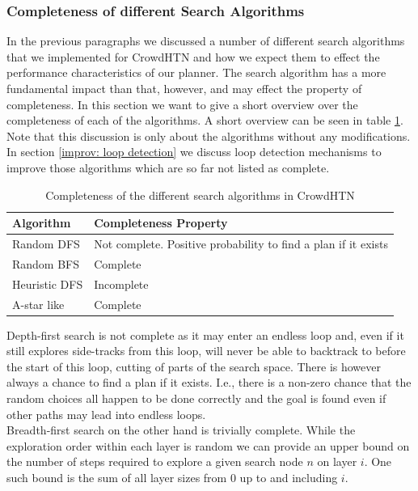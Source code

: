 \subsubsection{Completeness of different Search Algorithms}
In the previous paragraphs we discussed a number of different search algorithms that we implemented for CrowdHTN and how we expect them to effect the performance characteristics of our planner. The search algorithm has a more fundamental impact than that, however, and may effect the property of completeness. In this section we want to give a short overview over the completeness of each of the algorithms. A short overview can be seen in table \ref{table: search completeness}. Note that this discussion is only about the algorithms without any modifications. In section \ref{improv: loop detection} we discuss loop detection mechanisms to improve those algorithms which are so far not listed as complete. \\
\begin{table}
	\caption{Completeness of the different search algorithms in CrowdHTN}
	\label{table: search completeness}
	\centering
	\begin{tabular}{| l | l |}
		\hline
		Algorithm & Completeness Property \\
		\hline
		Random DFS & Not complete. Positive probability to find a plan if it exists \\
		Random BFS & Complete \\
		Heuristic DFS & Incomplete \\
		A-star like & Complete \\
		\hline
	\end{tabular}
\end{table}
Depth-first search is not complete as it may enter an endless loop and, even if it still explores side-tracks from this loop, will never be able to backtrack to before the start of this loop, cutting of parts of the search space. There is however always a chance to find a plan if it exists. I.e., there is a non-zero chance that the random choices all happen to be done correctly and the goal is found even if other paths may lead into endless loops. \\
Breadth-first search on the other hand is trivially complete. While the exploration order within each layer is random we can provide an upper bound on the number of steps required to explore a given search node $n$ on layer $i$. One such bound is the sum of all layer sizes from 0 up to and including $i$. \\
